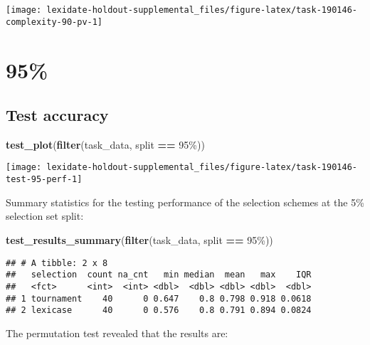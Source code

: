 \documentclass[
]{book}
\newenvironment{Shaded}{\begin{snugshade}}{\end{snugshade}}
\newcommand{\FunctionTok}[1]{\textcolor[rgb]{0.13,0.29,0.53}{\textbf{#1}}}
\newcommand{\NormalTok}[1]{#1}
\newcommand{\SpecialCharTok}[1]{\textcolor[rgb]{0.81,0.36,0.00}{\textbf{#1}}}
\newcommand{\StringTok}[1]{\textcolor[rgb]{0.31,0.60,0.02}{#1}}
\begin{document}
\texttt{[image: lexidate-holdout-supplemental\_files/figure-latex/task-190146-complexity-90-pv-1]}

\hypertarget{section-19}{%
\section{95\%}\label{section-19}}

\hypertarget{test-accuracy-19}{%
\subsection{Test accuracy}\label{test-accuracy-19}}

\begin{Shaded}
\begin{Highlighting}[]
\FunctionTok{test\_plot}\NormalTok{(}\FunctionTok{filter}\NormalTok{(task\_data, split }\SpecialCharTok{==} \StringTok{\textquotesingle{}95\%\textquotesingle{}}\NormalTok{))}
\end{Highlighting}
\end{Shaded}

\texttt{[image: lexidate-holdout-supplemental\_files/figure-latex/task-190146-test-95-perf-1]}

Summary statistics for the testing performance of the selection schemes at the 5\% selection set split:

\begin{Shaded}
\begin{Highlighting}[]
\FunctionTok{test\_results\_summary}\NormalTok{(}\FunctionTok{filter}\NormalTok{(task\_data, split }\SpecialCharTok{==} \StringTok{\textquotesingle{}95\%\textquotesingle{}}\NormalTok{))}
\end{Highlighting}
\end{Shaded}

\begin{verbatim}
## # A tibble: 2 x 8
##   selection  count na_cnt   min median  mean   max    IQR
##   <fct>      <int>  <int> <dbl>  <dbl> <dbl> <dbl>  <dbl>
## 1 tournament    40      0 0.647    0.8 0.798 0.918 0.0618
## 2 lexicase      40      0 0.576    0.8 0.791 0.894 0.0824
\end{verbatim}

The permutation test revealed that the results are:
\end{document}
